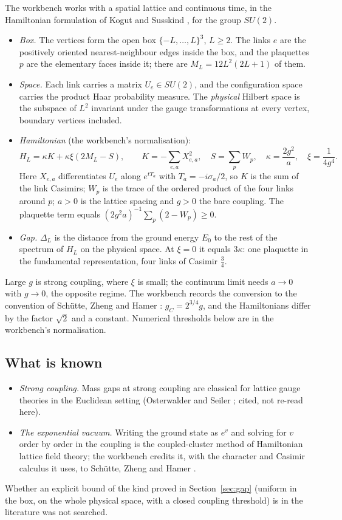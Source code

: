 The workbench works with a spatial lattice and continuous time, in the Hamiltonian formulation of Kogut and Susskind \cite{KogutSusskind}, for the group $SU(2)$.
\begin{itemize}
\item \emph{Box.} The vertices form the open box $\{-L,\dots,L\}^3$, $L\ge2$. The links $e$ are the positively oriented nearest-neighbour edges inside the box, and the plaquettes $p$ are the elementary faces inside it; there are $M_L=12L^2(2L+1)$ of them.
\item \emph{Space.} Each link carries a matrix $U_e\in SU(2)$, and the configuration space carries the product Haar probability measure. The \emph{physical} Hilbert space is the subspace of $L^2$ invariant under the gauge transformations at every vertex, boundary vertices included.
\item \emph{Hamiltonian} (the workbench's normalisation):
\[
H_L=\kappa K+\kappa\xi(2M_L-S),\qquad K=-\sum_{e,a}X_{e,a}^2,\quad S=\sum_pW_p,\quad \kappa=\frac{2g^2}a,\quad \xi=\frac1{4g^4}.
\]
Here $X_{e,a}$ differentiates $U_e$ along $e^{tT_a}$ with $T_a=-i\sigma_a/2$, so $K$ is the sum of the link Casimirs; $W_p$ is the trace of the ordered product of the four links around $p$; $a>0$ is the lattice spacing and $g>0$ the bare coupling. The plaquette term equals $(2g^2a)^{-1}\sum_p(2-W_p)\ge0$.
\item \emph{Gap.} $\Delta_L$ is the distance from the ground energy $E_0$ to the rest of the spectrum of $H_L$ on the physical space. At $\xi=0$ it equals $3\kappa$: one plaquette in the fundamental representation, four links of Casimir $\frac34$.
\end{itemize}
Large $g$ is strong coupling, where $\xi$ is small; the continuum limit needs $a\to0$ with $g\to0$, the opposite regime. The workbench records the conversion to the convention of Schütte, Zheng and Hamer \cite{SchutteZhengHamer}: $g_C=2^{3/4}g$, and the Hamiltonians differ by the factor $\sqrt2$ and a constant. Numerical thresholds below are in the workbench's normalisation.

\subsection{What is known}

\begin{itemize}
\item \emph{Strong coupling.} Mass gaps at strong coupling are classical for lattice gauge theories in the Euclidean setting (Osterwalder and Seiler \cite{OsterwalderSeiler}; cited, not re-read here).
\item \emph{The exponential vacuum.} Writing the ground state as $e^v$ and solving for $v$ order by order in the coupling is the coupled-cluster method of Hamiltonian lattice field theory; the workbench credits it, with the character and Casimir calculus it uses, to Schütte, Zheng and Hamer \cite{SchutteZhengHamer}.
\end{itemize}
Whether an explicit bound of the kind proved in Section~\ref{sec:gap} (uniform in the box, on the whole physical space, with a closed coupling threshold) is in the literature was not searched.

